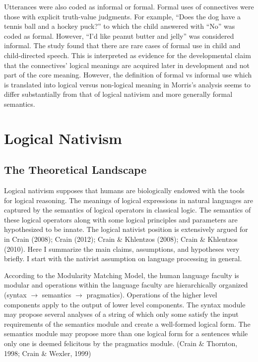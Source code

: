 \documentclass[oneside]{report}
\theoremstyle{definition}
\theoremstyle{definition}
\theoremstyle{definition}
\theoremstyle{remark}
\begin{document}
Utterances were also coded as informal or formal. Formal uses of
connectives were those with explicit truth-value judgments. For example,
``Does the dog have a tennis ball and a hockey puck?'' to which the
child answered with ``No'' was coded as formal. However, ``I'd like
peanut butter and jelly'' was considered informal. The study found that
there are rare cases of formal use in child and child-directed speech.
This is interpreted as evidence for the developmental claim that the
connectives' logical meanings are acquired later in development and not
part of the core meaning. However, the definition of formal vs informal
use which is translated into logical versus non-logical meaning in
Morris's analysis seems to differ substantially from that of logical
nativism and more generally formal semantics.

\section{Logical Nativism}\label{logical-nativism}

\subsection{The Theoretical Landscape}\label{the-theoretical-landscape}

Logical nativism supposes that humans are biologically endowed with the
tools for logical reasoning. The meanings of logical expressions in
natural languages are captured by the semantics of logical operators in
classical logic. The semantics of these logical operators along with
some logical principles and parameters are hypothesized to be innate.
The logical nativist position is extensively argued for in Crain (2008);
Crain (2012); Crain \& Khlentzos (2008); Crain \& Khlentzos (2010). Here
I summarize the main claims, assumptions, and hypotheses very briefly. I
start with the nativist assumption on language processing in general.

According to the Modularity Matching Model, the human language faculty
is modular and operations within the language faculty are hierarchically
organized (syntax \(\rightarrow\) semantics \(\rightarrow\) pragmatics).
Operations of the higher level components apply to the output of lower
level components. The syntax module may propose several analyses of a
string of which only some satisfy the input requirements of the
semantics module and create a well-formed logical form. The semantics
module may propose more than one logical form for a sentences while only
one is deemed felicitous by the pragmatics module. (Crain \& Thornton,
1998; Crain \& Wexler, 1999)
\end{document}

